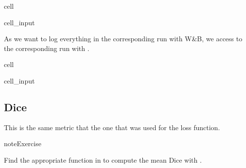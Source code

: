 \documentclass[letterpaper,10pt,english]{jupyterBook}
\begin{document}
\begin{sphinxuseclass}{cell}
\begin{sphinxVerbatimInput}
\begin{sphinxuseclass}{cell_input}
\begin{sphinxVerbatim}[commandchars=\\\{\}]
       
\end{sphinxVerbatim}

\end{sphinxuseclass}\end{sphinxVerbatimInput}

\end{sphinxuseclass}
\sphinxAtStartPar
As we want to log everything in the corresponding run with W\&B, we access to the corresponding run with .

\begin{sphinxuseclass}{cell}\begin{sphinxVerbatimInput}

\begin{sphinxuseclass}{cell_input}
\begin{sphinxVerbatim}[commandchars=\\\{\}]
  
  
\end{sphinxVerbatim}

\end{sphinxuseclass}\end{sphinxVerbatimInput}

\end{sphinxuseclass}

\subsection{Dice}
\label{\detokenize{notebooks/Tutorial3_Segmentation/Tutorial3_Segmentation_student:dice}}
\sphinxAtStartPar
This is the same metric that the one that was used for the loss function.

\begin{sphinxadmonition}{note}{Exercise}

\sphinxAtStartPar
Find the appropriate function in  to compute the mean Dice with .
\end{sphinxadmonition}
\end{document}
